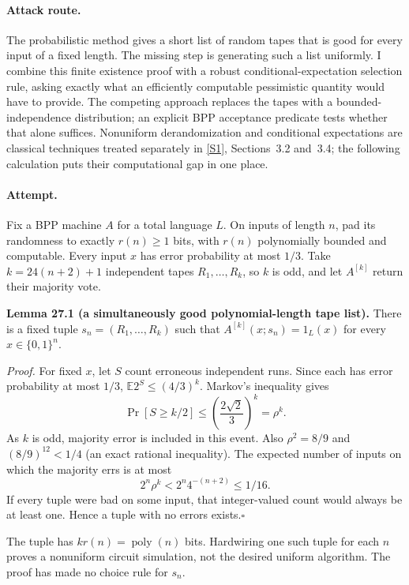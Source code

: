 \documentclass[11pt,a4paper]{article}
\newcommand{\sref}[2]{\hyperlink{source:#1:#2}{[S#2]}}
\numberwithin{equation}{section}
\begin{document}
\paragraph{Attack route.}
The probabilistic method gives a short list of random tapes that is good
for every input of a fixed length. The missing step is generating such a
list uniformly. I combine this finite existence proof with a robust
conditional-expectation selection rule, asking exactly what an efficiently
computable pessimistic quantity would have to provide. The competing
approach replaces the tapes with a bounded-independence distribution;
an explicit BPP acceptance predicate tests whether that alone suffices.
Nonuniform derandomization and conditional expectations are classical
techniques treated separately in \sref{statement}{1}, Sections~3.2 and~3.4;
the following calculation puts their computational gap in one place.

\paragraph{Attempt.}
Fix a BPP machine $A$ for a total language $L$. On inputs of length $n$,
pad its randomness to exactly $r(n)\ge1$ bits, with $r(n)$ polynomially
bounded and computable. Every input $x$ has error probability at most
$1/3$. Take $k=24(n+2)+1$ independent tapes $R_1,\ldots,R_k$, so $k$ is
odd, and let $A^{[k]}$ return their majority vote.

\textbf{Lemma 27.1 (a simultaneously good polynomial-length tape list).}
There is a fixed tuple $s_n=(R_1,\ldots,R_k)$ such that
$A^{[k]}(x;s_n)=1_L(x)$ for every $x\in\{0,1\}^n$.

\emph{Proof.} For fixed $x$, let $S$ count erroneous independent runs.
Since each has error probability at most $1/3$,
$\mathbb E2^S\le(4/3)^k$. Markov's inequality gives
\[
 \Pr[S\ge k/2]\le\left(\frac{2\sqrt2}{3}\right)^k=\rho^k.
\]
As $k$ is odd, majority error is included in this event. Also
$\rho^2=8/9$ and $(8/9)^{12}<1/4$ (an exact rational inequality).
The expected number of inputs on which the majority errs is at most
\begin{equation}\label{r27:smallpotential}
       2^n\rho^k<2^n4^{-(n+2)}\le1/16.
\end{equation}
If every tuple were bad on some input, that integer-valued count would
always be at least one. Hence a tuple with no errors exists.\hfill$\square$

The tuple has $kr(n)=\operatorname{poly}(n)$ bits. Hardwiring one such
tuple for each $n$ proves a nonuniform circuit simulation, not the desired
uniform algorithm. The proof has made no choice rule for $s_n$.
\end{document}
